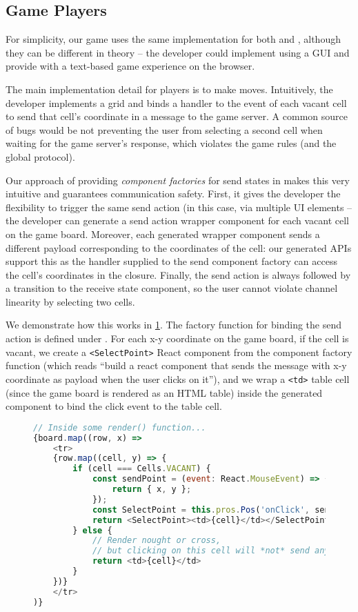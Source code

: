 \subsection{Game Players}
For simplicity, our game uses the same implementation for both
 and , although they can be different in theory --
the developer could implement  using a GUI and provide
 with a text-based game experience on the browser.

The main implementation detail for players
is to make moves. 
Intuitively, the developer implements a grid and binds a handler
to the  event of each vacant cell to send that cell's coordinate 
in a  message to the game server.
A common source of bugs would be not preventing the user from selecting
a second cell when waiting for the game server's response,
which violates the game rules (and the global protocol).

Our approach of providing \textit{component factories} for send states
in \reactcodegen makes this very intuitive and guarantees communication safety.
First, it gives the developer the flexibility to trigger
the same send action (in this case,  via multiple
UI elements -- the developer can generate a send action wrapper component 
for each vacant cell on the game board.
Moreover, each generated wrapper component sends a different payload
corresponding to the coordinates of the cell:
our generated APIs support this as the handler supplied
to the send component factory can access the cell's coordinates in the closure.
Finally, the send action is always followed by a transition to the receive
state component, so the user cannot violate channel linearity by selecting
two cells.

We demonstrate how this works in \cref{lst:gamesendfactory}.
The factory function for binding the  send action
is defined under .
For each x-y coordinate on the game board, if the cell is vacant,
we create a \texttt{<SelectPoint>} React component from the
component factory function (which reads ``build a react
component that sends the  message with x-y coordinate
as payload when the user clicks on it''), and we wrap
a \texttt{<td>} table cell (since the game board is rendered as an
HTML table) inside the generated component to bind the click event
to the table cell.

\begin{figure}[!h]
\begin{lstlisting}[language=javascript,tabsize=2]
// Inside some render() function...
{board.map((row, x) =>
	<tr>
	{row.map((cell, y) => {
		if (cell === Cells.VACANT) {
			const sendPoint = (event: React.MouseEvent) => {
				return { x, y };
			});
			const SelectPoint = this.pros.Pos('onClick', sendPoint);
			return <SelectPoint><td>{cell}</td></SelectPoint>
		} else {
			// Render nought or cross,
			// but clicking on this cell will *not* send anything
			return <td>{cell}</td>
		}		
	})}
	</tr>
)}
\end{lstlisting}
\label{lst:gamesendfactory}
\end{figure}

